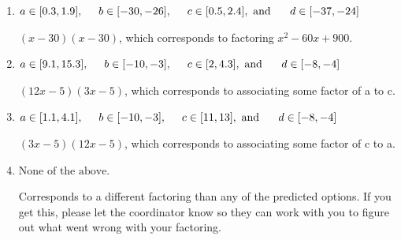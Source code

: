 \documentclass{extbook}[14pt]
\begin{document}
\begin{enumerate}
{\begin{enumerate}[label=\Alph*.]
* $(6x -5)(6x -5)$, which is the correct option.
\item \( a \in [0.3, 1.9], \hspace*{5mm} b \in [-30, -26], \hspace*{5mm} c \in [0.5, 2.4], \text{ and } \hspace*{5mm} d \in [-37, -24] \)

 $(x -30)(x -30)$, which corresponds to factoring $x^{2} -60 x + 900$.
\item \( a \in [9.1, 15.3], \hspace*{5mm} b \in [-10, -3], \hspace*{5mm} c \in [2, 4.3], \text{ and } \hspace*{5mm} d \in [-8, -4] \)

 $(12x -5)(3x -5)$, which corresponds to associating some factor of a to c.
\item \( a \in [1.1, 4.1], \hspace*{5mm} b \in [-10, -3], \hspace*{5mm} c \in [11, 13], \text{ and } \hspace*{5mm} d \in [-8, -4] \)

 $(3x -5)(12x -5)$, which corresponds to associating some factor of c to a.
\item \( \text{None of the above.} \)

 Corresponds to a different factoring than any of the predicted options. If you get this, please let the coordinator know so they can work with you to figure out what went wrong with your factoring.
\end{enumerate}

}
\end{enumerate}
\end{document}
